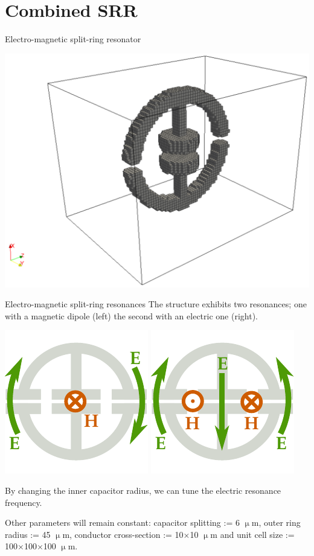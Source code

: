 \documentclass[t]{beamer} \usepackage[english]{babel} \usepackage[utf8]{inputenc} \usetheme{Frankfurt} %
\begin{document}
\section{Combined SRR}
\begin{frame}{Electro-magnetic split-ring resonator}%

\hfill\includegraphics[width=.85\textwidth]{../img-cdh-new/emSRR_snapshot.pdf} \hfill\;
\end{frame} %

\begin{frame}{Electro-magnetic split-ring resonances}%
The structure exhibits two resonances; one with a magnetic dipole (left) the second with an electric one (right).

\hfill\includegraphics[height=0.22\textwidth]{../img/drawing_emcSRRpad_resM.pdf}\hfill
\includegraphics[height=0.22\textwidth]{../img/drawing_emcSRRpad_resE2.pdf}\hfill\;

By changing the inner capacitor radius, we can tune the electric resonance frequency.

\vfill
Other parameters will remain constant: capacitor splitting := 6 $\upmu$m, outer ring radius := 45 $\upmu$m, conductor cross-section := 10$\times$10 $\upmu$m and unit cell size := 100$\times$100$\times$100 $\upmu$m.
\end{frame} %
\end{document}
